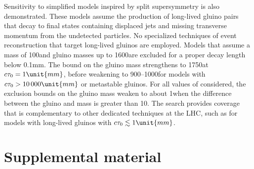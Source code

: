 Sensitivity to simplified models inspired by split supersymmetry is
also demonstrated. These models assume the production of long-lived
gluino pairs that decay to final states containing displaced
jets and missing transverse momentum from the undetected \PSGczDo
particles. No specialized techniques of event reconstruction that
target long-lived gluinos are employed. Models that assume a \PSGczDo
mass of 100\GeV and gluino masses up to 1600\GeV are excluded for a proper
decay length \ctau below 0.1\unit{mm}. The bound on the gluino mass
strengthens to 1750\GeV at $\ctau = 1\unit{mm}$, before weakening to
900--1000\GeV for models with $\ctau > 10\,000\unit{mm}$ or metastable
gluinos.
For all values of \ctau considered, the exclusion bounds on the gluino
mass weaken to about 1\TeV when the difference between the gluino and
\PSGczDo mass is greater than 10\GeV.
The
search provides coverage that is complementary to other dedicated
techniques at the LHC, such as for models with long-lived gluinos with
$\ctau \lesssim 1\unit{mm}$.


\clearpage



\clearpage
\appendix
\section{Supplemental material\label{app:suppMat}}


